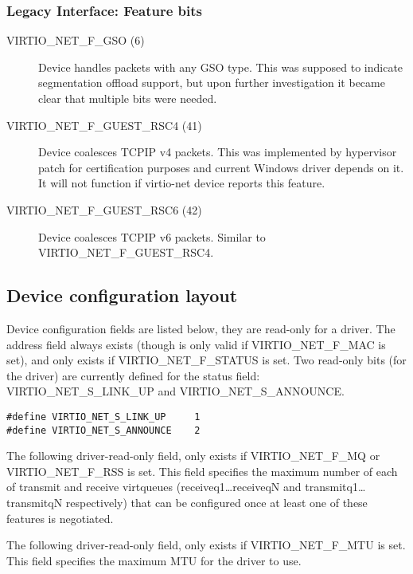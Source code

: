 \subsubsection{Legacy Interface: Feature bits}\label{sec:Device Types / Network Device / Feature bits / Legacy Interface: Feature bits}
\begin{description}
\item[VIRTIO_NET_F_GSO (6)] Device handles packets with any GSO type. This was supposed to indicate segmentation offload support, but
upon further investigation it became clear that multiple bits were needed.
\item[VIRTIO_NET_F_GUEST_RSC4 (41)] Device coalesces TCPIP v4 packets. This was implemented by hypervisor patch for certification
purposes and current Windows driver depends on it. It will not function if virtio-net device reports this feature.
\item[VIRTIO_NET_F_GUEST_RSC6 (42)] Device coalesces TCPIP v6 packets. Similar to VIRTIO_NET_F_GUEST_RSC4.
\end{description}

\subsection{Device configuration layout}\label{sec:Device Types / Network Device / Device configuration layout}
\label{sec:Device Types / Block Device / Feature bits / Device configuration layout}

Device configuration fields are listed below, they are read-only for a driver. The  address field
always exists (though is only valid if VIRTIO_NET_F_MAC is set), and
 only exists if VIRTIO_NET_F_STATUS is set. Two
read-only bits (for the driver) are currently defined for the status field:
VIRTIO_NET_S_LINK_UP and VIRTIO_NET_S_ANNOUNCE.

\begin{lstlisting}
#define VIRTIO_NET_S_LINK_UP     1
#define VIRTIO_NET_S_ANNOUNCE    2
\end{lstlisting}

The following driver-read-only field,  only exists if
VIRTIO_NET_F_MQ or VIRTIO_NET_F_RSS is set. This field specifies the maximum number
of each of transmit and receive virtqueues (receiveq1\ldots receiveqN
and transmitq1\ldots transmitqN respectively) that can be configured once at least one of these features
is negotiated.

The following driver-read-only field,  only exists if
VIRTIO_NET_F_MTU is set. This field specifies the maximum MTU for the driver to
use.

